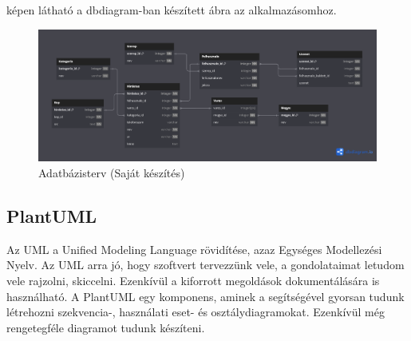 \documentclass[]{thesis-ekf}
\theoremstyle{definition}
\theoremstyle{remark}
\begin{document}
	 képen látható a dbdiagram-ban készített ábra az alkalmazásomhoz.
	
	\begin{figure}[ht!]
		\centering
		\includegraphics[width=15cm]{./tervezes/dbdiagram}
		\caption{Adatbázisterv (Saját készítés)} 
		\label{dbdiagram}
	\end{figure}
	
	\subsection{PlantUML}\label{sc-plantuml}
	Az UML a Unified Modeling Language rövidítése, azaz Egységes Modellezési Nyelv. Az UML arra jó, hogy szoftvert tervezzünk vele, a gondolataimat letudom vele rajzolni, skiccelni. Ezenkívül a kiforrott megoldások dokumentálására is használható. A PlantUML egy komponens, aminek a segítségével gyorsan tudunk létrehozni szekvencia-, használati eset- és osztálydiagramokat. Ezenkívül még rengetegféle diagramot tudunk készíteni. \cite{PlantUML}
	
\end{document}
